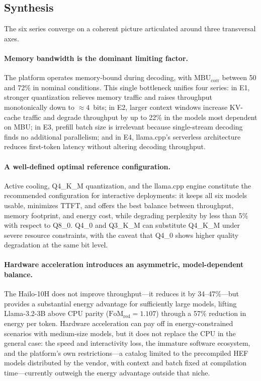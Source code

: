 \documentclass[acmsmall,natbib=false]{acmart}
\begin{document}
\subsection{Synthesis}\label{sec:synthesis}

The six series converge on a coherent picture articulated around three
transversal axes.

\paragraph{Memory bandwidth is the dominant limiting factor.}
The platform operates memory-bound during decoding, with
$\mathrm{MBU}_{\mathrm{corr}}$ between 50 and 72\% in nominal conditions.
This single bottleneck unifies four series: in E1, stronger quantization
relieves memory traffic and raises throughput monotonically down to
${\approx}4$~bits; in E2, larger context windows increase KV-cache traffic
and degrade throughput by up to 22\% in the models most dependent on MBU; in
E3, prefill batch size is irrelevant because single-stream decoding finds no
additional parallelism; and in E4, llama.cpp's serverless architecture
reduces first-token latency without altering decoding throughput.

\paragraph{A well-defined optimal reference configuration.}
Active cooling, Q4\_K\_M quantization, and the llama.cpp engine constitute
the recommended configuration for interactive deployments: it keeps all six
models usable, minimizes TTFT, and offers the best balance between
throughput, memory footprint, and energy cost, while degrading perplexity by
less than 5\% with respect to Q8\_0. Q4\_0 and Q3\_K\_M can substitute
Q4\_K\_M under severe resource constraints, with the caveat that Q4\_0 shows
higher quality degradation at the same bit level.

\paragraph{Hardware acceleration introduces an asymmetric, model-dependent
balance.}
The Hailo-10H does not improve throughput---it reduces it by 34--47\%---but
provides a substantial energy advantage for sufficiently large models,
lifting Llama-3.2-3B above CPU parity
($\mathrm{FoM}_{\mathrm{red}}=1.107$) through a 57\% reduction in energy per
token. Hardware acceleration can pay off in energy-constrained scenarios
with medium-size models, but it does not replace the CPU in the general
case: the speed and interactivity loss, the immature software ecosystem, and
the platform's own restrictions---a catalog limited to the precompiled HEF
models distributed by the vendor, with context and batch fixed at
compilation time---currently outweigh the energy advantage outside that
niche.
\end{document}
